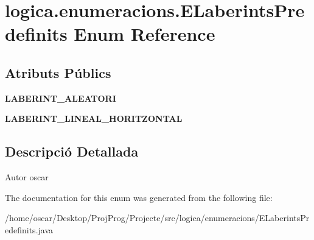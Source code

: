 \hypertarget{enumlogica_1_1enumeracions_1_1_e_laberints_predefinits}{\section{logica.\+enumeracions.\+E\+Laberints\+Predefinits Enum Reference}
\label{enumlogica_1_1enumeracions_1_1_e_laberints_predefinits}
}
\subsection*{Atributs Públics}
\begin{DoxyCompactItemize}
\item 
\hypertarget{enumlogica_1_1enumeracions_1_1_e_laberints_predefinits_a9a31f811f66ac2a2decdbdd4526d8e4c}{{\bfseries L\+A\+B\+E\+R\+I\+N\+T\+\_\+\+A\+L\+E\+A\+T\+O\+R\+I}}\label{enumlogica_1_1enumeracions_1_1_e_laberints_predefinits_a9a31f811f66ac2a2decdbdd4526d8e4c}

\item 
\hypertarget{enumlogica_1_1enumeracions_1_1_e_laberints_predefinits_ae4d74c390c4738abcef89354399001ac}{{\bfseries L\+A\+B\+E\+R\+I\+N\+T\+\_\+\+L\+I\+N\+E\+A\+L\+\_\+\+H\+O\+R\+I\+T\+Z\+O\+N\+T\+A\+L}}\label{enumlogica_1_1enumeracions_1_1_e_laberints_predefinits_ae4d74c390c4738abcef89354399001ac}

\end{DoxyCompactItemize}


\subsection{Descripció Detallada}
\begin{DoxyAuthor}{Autor}
oscar 
\end{DoxyAuthor}


The documentation for this enum was generated from the following file\+:\begin{DoxyCompactItemize}
\item 
/home/oscar/\+Desktop/\+Proj\+Prog/\+Projecte/src/logica/enumeracions/E\+Laberints\+Predefinits.\+java\end{DoxyCompactItemize}
